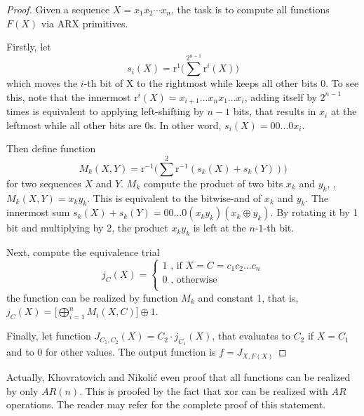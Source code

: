 \begin{proof}
Given a sequence $X=x_1x_2\cdots x_n$, the task is to compute all functions $F(X)$ via
ARX primitives.

Firstly, let $$s_i(X)=\mathrm{r}^1\Bigg(\sum^{2^{n-1}}\mathrm{r}^i(X)\Bigg)$$ which
moves the $i$-th bit of X to the rightmost while keeps all other bits 0. To see this,
note that the innermost $\mathrm{r}^i(X)=x_{i+1}...x_nx_1...x_i$, adding itself by
$2^{n-1}$ times is equivalent to applying left-shifting by $n-1$ bits, that results
in $x_i$ at the leftmost while all other bits are $0$s. In other word, $s_i(X)=00...0x_i$.

Then define function $$M_k(X,Y)=\mathrm{r}^{-1}\Bigg(\sum^2\mathrm{r}^{-1}(s_k(X)+s_k(Y))\Bigg)$$
for two sequences $X$ and $Y$. $M_k$ compute the product of two bits $x_k$ and $y_k$,
\ie, $M_k(X,Y)=x_ky_k$. This is equivalent to the bitwise-and of $x_k$ and $y_k$.
The innermost sum $s_k(X)+s_k(Y)=00...0(x_ky_k)(x_k\oplus y_k)$. By rotating it by 1
bit and multiplying by 2, the product $x_ky_k$ is left at the $n\textrm{-}1$-th bit.

Next, compute the equivalence trial $$j_C(X)=\begin{cases}
1\textrm{ , if }X=C=c_1c_2...c_n\\
0\textrm{ , otherwise}\\
\end{cases}$$ the function can be realized by function $M_k$ and constant 1, that is,
$j_C(X)=\Big[\bigoplus_{i=1}^nM_i(X,C)\Big]\oplus1$.

Finally, let function $J_{C_1,C_2}(X)=C_2\cdot j_{C_1}(X)$, that evaluates to $C_2$ if
$X=C_1$ and to 0 for other values. The output function is $f=J_{\textit{X}, F(\textit{X})}$
\end{proof}

Actually, Khovratovich and Nikoli{\'c} even proof that all functions can be realized by
only $AR(n)$. This is proofed by the fact that xor can be realized with $AR$ operations.
The reader may refer \cite{khovratovich2010rotational} for the complete proof of this
statement.
